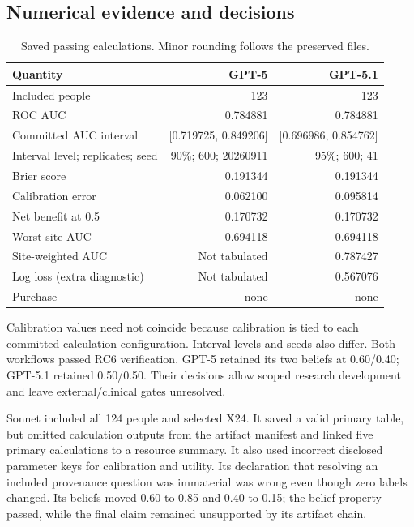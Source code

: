 \documentclass[11pt,a4paper]{article}
\begin{document}
\subsection{Numerical evidence and decisions}

\begin{table}[H]\small
\caption{Saved passing calculations. Minor rounding follows the preserved files.}
\begin{tabularx}{\textwidth}{@{}Yrr@{}}\toprule
Quantity & GPT-5 & GPT-5.1 \\\midrule
Included people & 123 & 123 \\
ROC AUC & 0.784881 & 0.784881 \\
Committed AUC interval & [0.719725, 0.849206] & [0.696986, 0.854762] \\
Interval level; replicates; seed & 90\%; 600; 20260911 & 95\%; 600; 41 \\
Brier score & 0.191344 & 0.191344 \\
Calibration error & 0.062100 & 0.095814 \\
Net benefit at 0.5 & 0.170732 & 0.170732 \\
Worst-site AUC & 0.694118 & 0.694118 \\
Site-weighted AUC & Not tabulated & 0.787427 \\
Log loss (extra diagnostic) & Not tabulated & 0.567076 \\
Purchase & none & none \\\bottomrule
\end{tabularx}
\end{table}

Calibration values need not coincide because calibration is tied to each committed calculation configuration. Interval levels and seeds also differ. Both workflows passed RC6 verification. GPT-5 retained its two beliefs at 0.60/0.40; GPT-5.1 retained 0.50/0.50. Their decisions allow scoped research development and leave external/clinical gates unresolved.

Sonnet included all 124 people and selected X24. It saved a valid primary table, but omitted calculation outputs from the artifact manifest and linked five primary calculations to a resource summary. It also used incorrect disclosed parameter keys for calibration and utility. Its declaration that resolving an included provenance question was immaterial was wrong even though zero labels changed. Its beliefs moved 0.60 to 0.85 and 0.40 to 0.15; the belief property passed, while the final claim remained unsupported by its artifact chain.
\end{document}
